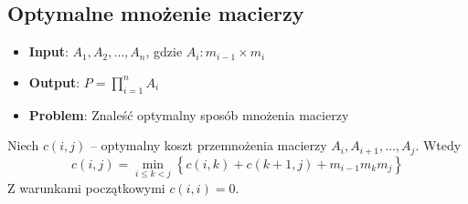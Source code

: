 \documentclass[11pt,a4paper]{article}
\begin{document}
\subsection{Optymalne mnożenie macierzy}
\begin{itemize}
    \item \textbf{Input}: $A_1, A_2, \dots, A_n$, gdzie $A_i:m_{i-1}\times m_i$
    \item \textbf{Output}: $P = \prod_{i=1}^n A_i$
    \item \textbf{Problem}: Znaleść optymalny sposób mnożenia macierzy
\end{itemize}
Niech $c(i, j)$ -- optymalny koszt przemnożenia macierzy $A_i, A_{i+1}, \dots, A_j$. Wtedy
\[
    c(i, j) = \min_{i\leq k < j}\left\{c(i, k)+c(k+1, j)+m_{i-1}m_k m_j\right\}
\]
Z warunkami początkowymi $c(i, i) = 0$.
\end{document}

